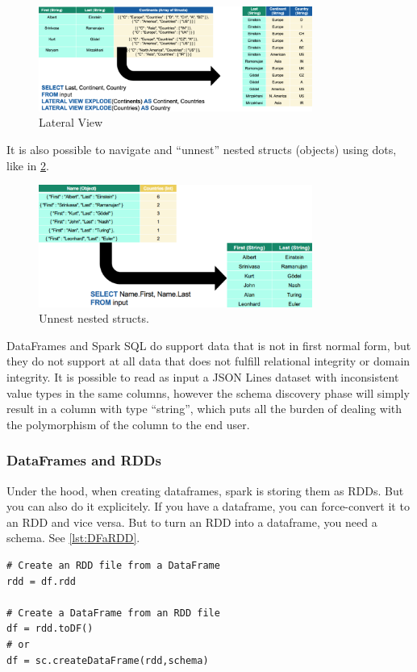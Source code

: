 \begin{figure}[h]
    \centering
    \includegraphics[width=0.8\textwidth]{Figures/LateralViewExplode.png}
    \caption{Lateral View}\label{fig:LatView}
\end{figure}

It is also possible to navigate and “unnest” nested structs (objects) using dots, like in \cref{fig:Unnest}.

\begin{figure}[h]
    \centering
    \includegraphics[width=0.8\textwidth]{Figures/UnnestStructs.png}
    \caption{Unnest nested structs.}\label{fig:Unnest}
\end{figure}

DataFrames and Spark SQL do support data that is not in first normal form, but they do not support at all data that does not fulfill relational integrity or domain integrity. It is possible to read as input a JSON Lines dataset with inconsistent value types in the same columns, however the schema discovery phase will simply result in a column with type “string”, which puts all the burden of dealing with the polymorphism of the column to the end user.


\subsubsection{DataFrames and RDDs}
Under the hood, when creating dataframes, spark is storing them as RDDs. But you can also do it explicitely. If you have a dataframe, you can force-convert it to an RDD and vice versa. But to turn an RDD into a dataframe, you need a schema. See \cref{lst:DFaRDD}.

\vspace{1\baselineskip}

\begin{lstlisting}[style=neutral,caption={DataFrames and RDDs},label={lst:DFaRDD}]
# Create an RDD file from a DataFrame
rdd = df.rdd

# Create a DataFrame from an RDD file
df = rdd.toDF()
# or
df = sc.createDataFrame(rdd,schema)
\end{lstlisting}

